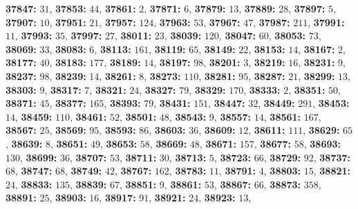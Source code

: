\textsf{\bfseries 37847:} $31$, \textsf{\bfseries 37853:} $44$, \textsf{\bfseries 37861:} $2$, \textsf{\bfseries 37871:} $6$, \textsf{\bfseries 37879:} $13$, \textsf{\bfseries 37889:} $28$, \textsf{\bfseries 37897:} $5$, \textsf{\bfseries 37907:} $10$, \textsf{\bfseries 37951:} $21$, \textsf{\bfseries 37957:} $124$, \textsf{\bfseries 37963:} $53$, \textsf{\bfseries 37967:} $47$, \textsf{\bfseries 37987:} $211$, \textsf{\bfseries 37991:} $11$, \textsf{\bfseries 37993:} $35$, \textsf{\bfseries 37997:} $27$, \textsf{\bfseries 38011:} $23$, \textsf{\bfseries 38039:} $120$, \textsf{\bfseries 38047:} $60$, \textsf{\bfseries 38053:} $73$, \textsf{\bfseries 38069:} $33$, \textsf{\bfseries 38083:} $6$, \textsf{\bfseries 38113:} $161$, \textsf{\bfseries 38119:} $65$, \textsf{\bfseries 38149:} $22$, \textsf{\bfseries 38153:} $14$, \textsf{\bfseries 38167:} $2$, \textsf{\bfseries 38177:} $40$, \textsf{\bfseries 38183:} $177$, \textsf{\bfseries 38189:} $14$, \textsf{\bfseries 38197:} $98$, \textsf{\bfseries 38201:} $3$, \textsf{\bfseries 38219:} $16$, \textsf{\bfseries 38231:} $9$, \textsf{\bfseries 38237:} $98$, \textsf{\bfseries 38239:} $14$, \textsf{\bfseries 38261:} $8$, \textsf{\bfseries 38273:} $110$, \textsf{\bfseries 38281:} $95$, \textsf{\bfseries 38287:} $21$, \textsf{\bfseries 38299:} $13$, \textsf{\bfseries 38303:} $9$, \textsf{\bfseries 38317:} $7$, \textsf{\bfseries 38321:} $24$, \textsf{\bfseries 38327:} $79$, \textsf{\bfseries 38329:} $170$, \textsf{\bfseries 38333:} $2$, \textsf{\bfseries 38351:} $50$, \textsf{\bfseries 38371:} $45$, \textsf{\bfseries 38377:} $165$, \textsf{\bfseries 38393:} $79$, \textsf{\bfseries 38431:} $151$, \textsf{\bfseries 38447:} $32$, \textsf{\bfseries 38449:} $291$, \textsf{\bfseries 38453:} $14$, \textsf{\bfseries 38459:} $110$, \textsf{\bfseries 38461:} $52$, \textsf{\bfseries 38501:} $48$, \textsf{\bfseries 38543:} $9$, \textsf{\bfseries 38557:} $14$, \textsf{\bfseries 38561:} $167$, \textsf{\bfseries 38567:} $25$, \textsf{\bfseries 38569:} $95$, \textsf{\bfseries 38593:} $86$, \textsf{\bfseries 38603:} $36$, \textsf{\bfseries 38609:} $12$, \textsf{\bfseries 38611:} $111$, \textsf{\bfseries 38629:} $65$, \textsf{\bfseries 38639:} $8$, \textsf{\bfseries 38651:} $49$, \textsf{\bfseries 38653:} $58$, \textsf{\bfseries 38669:} $48$, \textsf{\bfseries 38671:} $157$, \textsf{\bfseries 38677:} $58$, \textsf{\bfseries 38693:} $130$, \textsf{\bfseries 38699:} $36$, \textsf{\bfseries 38707:} $53$, \textsf{\bfseries 38711:} $30$, \textsf{\bfseries 38713:} $5$, \textsf{\bfseries 38723:} $66$, \textsf{\bfseries 38729:} $92$, \textsf{\bfseries 38737:} $68$, \textsf{\bfseries 38747:} $68$, \textsf{\bfseries 38749:} $42$, \textsf{\bfseries 38767:} $162$, \textsf{\bfseries 38783:} $11$, \textsf{\bfseries 38791:} $4$, \textsf{\bfseries 38803:} $15$, \textsf{\bfseries 38821:} $24$, \textsf{\bfseries 38833:} $135$, \textsf{\bfseries 38839:} $67$, \textsf{\bfseries 38851:} $9$, \textsf{\bfseries 38861:} $53$, \textsf{\bfseries 38867:} $66$, \textsf{\bfseries 38873:} $358$, \textsf{\bfseries 38891:} $25$, \textsf{\bfseries 38903:} $16$, \textsf{\bfseries 38917:} $91$, \textsf{\bfseries 38921:} $24$, \textsf{\bfseries 38923:} $13$, 
